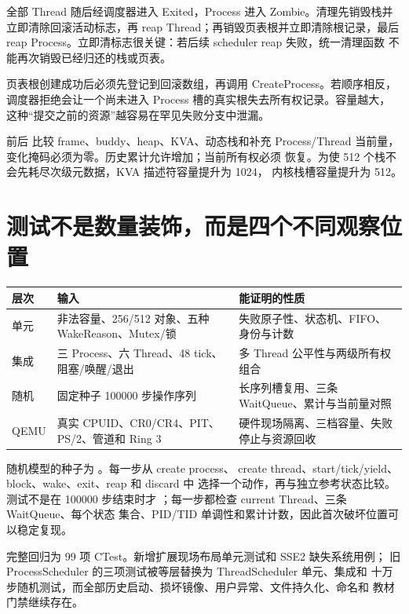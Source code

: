 全部 Thread 随后经调度器进入 Exited，Process 进入 Zombie。清理先销毁栈并
立即清除回滚活动标志，再 reap Thread；再销毁页表根并立即清除根记录，最后
reap Process。立即清标志很关键：若后续 scheduler reap 失败，统一清理函数
不能再次销毁已经归还的栈或页表。

\begin{failurebox}
页表根创建成功后必须先登记到回滚数组，再调用 CreateProcess。若顺序相反，
调度器拒绝会让一个尚未进入 Process 槽的真实根失去所有权记录。容量越大，
这种“提交之前的资源”越容易在罕见失败分支中泄漏。
\end{failurebox}

前后  比较 frame、buddy、heap、KVA、动态栈和补充
Process/Thread 当前量，变化掩码必须为零。历史累计允许增加；当前所有权必须
恢复。为使 512 个栈不会先耗尽次级元数据，KVA 描述符容量提升为 1024，
内核栈槽容量提升为 512。

\section{测试不是数量装饰，而是四个不同观察位置}

\begin{longtable}{L{0.18\textwidth}L{0.31\textwidth}L{0.39\textwidth}}
\toprule
层次 & 输入 & 能证明的性质\\
\midrule
单元 & 非法容量、256/512 对象、五种 WakeReason、Mutex/锁 &
失败原子性、状态机、FIFO、身份与计数\\
集成 & 三 Process、六 Thread、48 tick、阻塞/唤醒/退出 &
多 Thread 公平性与两级所有权组合\\
随机 & 固定种子 100000 步操作序列 &
长序列槽复用、三条 WaitQueue、累计与当前量对照\\
QEMU & 真实 CPUID、CR0/CR4、PIT、PS/2、管道和 Ring 3 &
硬件现场隔离、三档容量、失败停止与资源回收\\
\bottomrule
\end{longtable}

随机模型的种子为 。每一步从 create process、
create thread、start/tick/yield、block、wake、exit、reap 和 discard 中
选择一个动作，再与独立参考状态比较。测试不是在 100000 步结束时才
；每一步都检查 current Thread、三条 WaitQueue、每个状态
集合、PID/TID 单调性和累计计数，因此首次破坏位置可以稳定复现。

完整回归为 99 项 CTest。新增扩展现场布局单元测试和 SSE2 缺失系统用例；
旧 ProcessScheduler 的三项测试被等层替换为 ThreadScheduler 单元、集成和
十万步随机测试，而全部历史启动、损坏镜像、用户异常、文件持久化、命名和
教材门禁继续存在。

